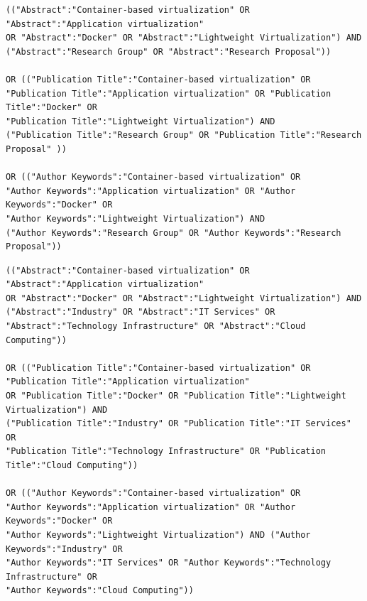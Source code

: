\begin{tcolorbox}[
		colback=gray!5,
		colframe=black!60,
		title=Cadena de búsqueda en IEE para investigación,
		fonttitle=\bfseries,
		sharp corners=south
	]
	\scriptsize %
	\begin{verbatim}
(("Abstract":"Container-based virtualization" OR "Abstract":"Application virtualization" 
OR "Abstract":"Docker" OR "Abstract":"Lightweight Virtualization") AND 
("Abstract":"Research Group" OR "Abstract":"Research Proposal")) 

OR (("Publication Title":"Container-based virtualization" OR 
"Publication Title":"Application virtualization" OR "Publication Title":"Docker" OR 
"Publication Title":"Lightweight Virtualization") AND 
("Publication Title":"Research Group" OR "Publication Title":"Research Proposal" ))

OR (("Author Keywords":"Container-based virtualization" OR 
"Author Keywords":"Application virtualization" OR "Author Keywords":"Docker" OR 
"Author Keywords":"Lightweight Virtualization") AND 
("Author Keywords":"Research Group" OR "Author Keywords":"Research Proposal"))
\end{verbatim}
\end{tcolorbox}

\begin{tcolorbox}[
		colback=gray!5,
		colframe=black!60,
		title=Cadena de búsqueda en IEE para extensión,
		fonttitle=\bfseries,
		sharp corners=south
	]
	\scriptsize %
	\begin{verbatim}
(("Abstract":"Container-based virtualization" OR "Abstract":"Application virtualization" 
OR "Abstract":"Docker" OR "Abstract":"Lightweight Virtualization") AND 
("Abstract":"Industry" OR "Abstract":"IT Services" OR 
"Abstract":"Technology Infrastructure" OR "Abstract":"Cloud Computing")) 

OR (("Publication Title":"Container-based virtualization" OR 
"Publication Title":"Application virtualization" 
OR "Publication Title":"Docker" OR "Publication Title":"Lightweight Virtualization") AND 
("Publication Title":"Industry" OR "Publication Title":"IT Services" OR 
"Publication Title":"Technology Infrastructure" OR "Publication Title":"Cloud Computing"))

OR (("Author Keywords":"Container-based virtualization" OR 
"Author Keywords":"Application virtualization" OR "Author Keywords":"Docker" OR 
"Author Keywords":"Lightweight Virtualization") AND ("Author Keywords":"Industry" OR 
"Author Keywords":"IT Services" OR "Author Keywords":"Technology Infrastructure" OR 
"Author Keywords":"Cloud Computing"))
\end{verbatim}
\end{tcolorbox}

